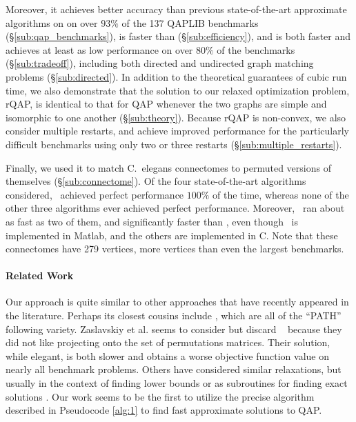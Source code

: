 \documentclass{article} %
\begin{document}
Moreover, it achieves better accuracy than previous state-of-the-art approximate algorithms on on over $93\%$ of the 137 QAPLIB benchmarks (\S \ref{sub:qap_benchmarks}), is faster than \Path (\S \ref{sub:efficiency}), and is both faster and achieves at least as low performance on over $80\%$ of the benchmarks (\S \ref{sub:tradeoff}),  including both directed and undirected graph matching problems (\S \ref{sub:directed}).  
In addition to the theoretical guarantees of cubic run time, we also demonstrate that the solution to our relaxed optimization problem, rQAP, is identical to that for QAP whenever the two graphs are simple and isomorphic to one another (\S \ref{sub:theory}).
Because rQAP is non-convex, we also consider multiple restarts, and achieve improved performance for the particularly difficult benchmarks using only two or three restarts (\S \ref{sub:multiple_restarts}).  

  
Finally, we used it to match C.~elegans connectomes to permuted versions of themselves (\S \ref{sub:connectome}). Of the four state-of-the-art algorithms considered, \FAQ\  achieved perfect performance $100\%$ of the time, whereas none of the other three algorithms ever achieved perfect performance.  Moreover, \FAQ\  ran about as fast as two of them, and significantly faster than \Path, even though \FAQ\  is implemented in Matlab, and the others are implemented in C.  Note that these connectomes have 279 vertices, more vertices than even the largest benchmarks. 



\vspace{-5pt}
\paragraph{Related Work}


Our approach is quite similar to other approaches that have recently appeared in the literature.  Perhaps its closest cousins include \cite{Zaslavskiy2009, Zaslavskiy2010}, which are all of the ``PATH'' following variety.  Zaslavskiy et al.    seems to consider but discard \FAQ\   \cite{Zaslavskiy2009} because they did not like projecting onto the set of permutations matrices.  Their solution, while elegant, is both slower and obtains a worse objective function value on nearly all benchmark problems.  Others have considered similar relaxations, but usually in the context of finding lower bounds  \cite{Anstreicher2001} or as subroutines for finding exact solutions \cite{Brixius2000}.  Our work seems to be the first to utilize the precise algorithm described in Pseudocode \ref{alg:1} to find fast approximate solutions to QAP.
\end{document}
